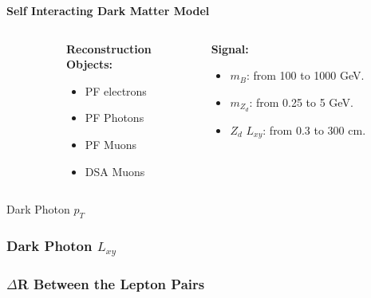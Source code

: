 \documentclass{beamer}
\begin{document}
\begin{frame}[t]{\textbf{Self Interacting Dark Matter Model}}
\begin{columns}
\begin{column}{.4\textwidth}
    \end{column}
    
    \begin{column}{.3\textwidth}
    \centering
    \textbf{\textcolor{peacockblue}{Reconstruction \\
    Objects:}}
    \begin{itemize}
        \item PF electrons
         \item PF Photons
         \item PF Muons
         \item DSA Muons
    \end{itemize}
        
    \end{column}
    \begin{column}{.3\textwidth}
    \centering
    \textbf{\textcolor{peacockblue}{Signal:}}
    \begin{itemize}
        \item   $m_B$: from 100 to 1000 GeV.
         \item $m_{Z_d}$: from 0.25 to 5 GeV.
         \item $Z_d$ $L_{xy}$: from 0.3 to 300 cm.
    \end{itemize}
    \end{column}
    \end{columns}
    \end{frame}
    \begin{frame}{Dark Photon $p_T$}
        
    \end{frame}
    \begin{frame}
        \frametitle{Dark Photon $L_{xy}$}
    \end{frame}
    \begin{frame}
        \frametitle{$\Delta$R Between the Lepton Pairs}
    \end{frame}
\end{document}
